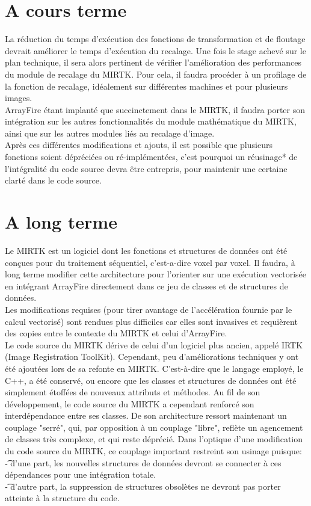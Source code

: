 \documentclass[10pt]{report}
\begin{document}
	\section{A cours terme}
	 La réduction du temps d'exécution des fonctions de transformation et de floutage devrait améliorer le temps d'exécution du recalage. Une fois le stage achevé sur le plan technique, il sera alors pertinent de vérifier l'amélioration des performances du module de recalage du MIRTK. Pour cela, il faudra procéder à un profilage de la fonction de recalage, idéalement sur différentes machines et pour plusieurs images.\\
	 ArrayFire étant implanté que succinctement dans le MIRTK, il faudra porter son intégration sur les autres fonctionnalités du module mathématique du MIRTK, ainsi que sur les autres modules liés au recalage d'image.\\
	 Après ces différentes modifications et ajouts, il est possible que plusieurs fonctions soient dépréciées ou ré-implémentées, c'est pourquoi un réusinage* de l'intégralité du code source devra être entrepris, pour maintenir une certaine clarté dans le code source.\\ 

	\section{A long terme}
	Le MIRTK est un logiciel dont les fonctions et structures de données ont été conçues pour du traitement séquentiel, c'est-a-dire voxel par voxel. Il faudra, à long terme modifier cette architecture pour l'orienter sur une exécution vectorisée en intégrant ArrayFire directement dans ce jeu de classes et de structures de données.\\ Les modifications requises (pour tirer avantage de l'accélération fournie par le calcul vectorisé) sont rendues plus difficiles car elles sont invasives et requièrent des copies entre le contexte du MIRTK et celui d'ArrayFire. \\
	Le code source du MIRTK dérive de celui d'un logiciel plus ancien, appelé IRTK (Image Registration ToolKit). Cependant, peu d'améliorations techniques y ont été ajoutées lors de sa refonte en MIRTK. C'est-à-dire que le langage employé, le C++, a été conservé, ou encore que les classes et structures de données ont été simplement étoffées de nouveaux attributs et méthodes. Au fil de son développement, le code source du MIRTK a cependant renforcé son interdépendance entre ses classes. De son architecture ressort maintenant un couplage "serré", qui, par opposition à un couplage "libre", reflète un agencement de classes très complexe, et qui reste déprécié. Dans l'optique d'une modification du code source du MIRTK, ce couplage important restreint son usinage puisque:\\
	\t - d'une part, les nouvelles structures de données devront se connecter à ces dépendances pour une intégration totale.\\
	\t - d'autre part, la suppression de structures obsolètes ne devront pas porter atteinte à la structure du code.\\
	
\end{document}
